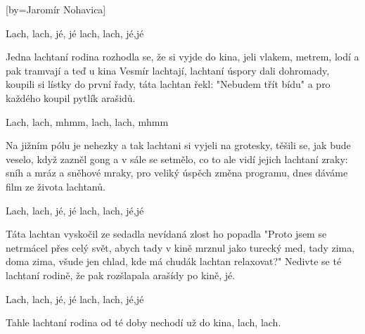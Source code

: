 [by={Jaromír Nohavica}]

\beginchorus{}
\lrep{} Lach, lach, jé, jé lach, lach, jé,jé \rrep{}
\endchorus{}

\beginverse{}
Jedna lachtaní rodina
rozhodla se, že si vyjde do kina,
jeli vlakem, metrem, lodí a pak tramvají
a teď u kina Vesmír lachtají,
lachtaní úspory dali dohromady,
koupili si lístky do první řady,
táta lachtan řekl: "Nebudem třít bídu"
a pro každého koupil pytlík arašidů.
\endverse{}

\beginchorus{}
\lrep{} Lach, lach, mhmm, lach, lach, mhmm \rrep{}
\endchorus{}

\beginverse{}
Na jižním pólu je nehezky
a tak lachtani si vyjeli na grotesky,
těšili se, jak bude veselo,
když zazněl gong a v sále se setmělo,
co to ale vidí jejich lachtaní zraky:
sníh a mráz a sněhové mraky,
pro veliký úspěch změna programu,
dnes dáváme film ze života lachtanů.
\endverse{}

\beginchorus{}
\lrep{} Lach, lach, jé, jé lach, lach, jé,jé \rrep{}
\endchorus{}

\beginverse{}
Táta lachtan vyskočil ze sedadla
nevídaná zlost ho popadla
"Proto jsem se netrmácel přes celý svět,
abych tady v kině mrznul jako turecký med,
tady zima, doma zima, všude jen chlad,
kde má chudák lachtan relaxovat?"
Nedivte se té lachtaní rodině,
že pak rozšlapala arašídy po kině, jé.
\endverse{}

\beginchorus{}
\lrep{} Lach, lach, jé, jé lach, lach, jé,jé \rrep{}
\endchorus{}

\beginverse{}
Tahle lachtaní rodina
od té doby nechodí už do kina, lach, lach. 
\endverse{}

\endsong{}
